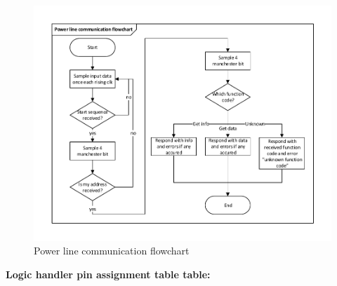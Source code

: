 \begin{figure}[H]
	\centering
	\includegraphics[width=.6\textwidth]{billeder/powerline_communication_flowchart}
	\caption{Power line communication flowchart}
	\label{fig:powerline_flow}
\end{figure}
\textbf{Logic handler pin assignment table table:}\\

